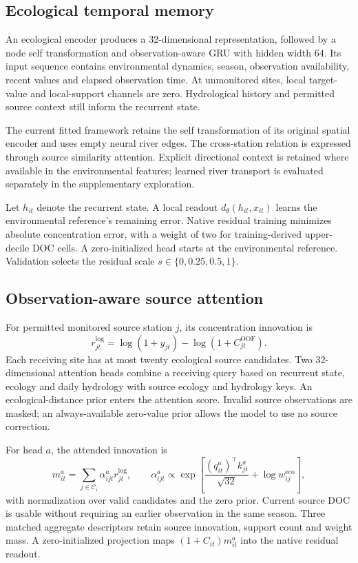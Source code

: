 \documentclass[11pt]{article}
\begin{document}
\subsection{Ecological temporal memory}
An ecological encoder produces a 32-dimensional representation, followed by a node self transformation and observation-aware GRU with hidden width 64. Its input sequence contains environmental dynamics, season, observation availability, recent values and elapsed observation time. At unmonitored sites, local target-value and local-support channels are zero. Hydrological history and permitted source context still inform the recurrent state.

The current fitted framework retains the self transformation of its original spatial encoder and uses empty neural river edges. The cross-station relation is expressed through source similarity attention. Explicit directional context is retained where available in the environmental features; learned river transport is evaluated separately in the supplementary exploration.

Let $h_{it}$ denote the recurrent state. A local readout $d_\theta(h_{it},x_{it})$ learns the environmental reference's remaining error. Native residual training minimizes absolute concentration error, with a weight of two for training-derived upper-decile DOC cells. A zero-initialized head starts at the environmental reference. Validation selects the residual scale $s\in\{0,0.25,0.5,1\}$.

\subsection{Observation-aware source attention}
For permitted monitored source station $j$, its concentration innovation is
\[
 r^{\log}_{jt}=\log(1+y_{jt})-\log(1+C^{\mathrm{OOF}}_{jt}).
\]
Each receiving site has at most twenty ecological source candidates. Two 32-dimensional attention heads combine a receiving query based on recurrent state, ecology and daily hydrology with source ecology and hydrology keys. An ecological-distance prior enters the attention score. Invalid source observations are masked; an always-available zero-value prior allows the model to use no source correction.

For head $a$, the attended innovation is
\[
 m^a_{it}=\sum_{j\in\mathcal C_i}\alpha^a_{ijt}r^{\log}_{jt},\qquad
 \alpha^a_{ijt}\propto\exp\!\left[\frac{(q^a_{it})^\top k^a_{jt}}{\sqrt{32}}+\log w^{\mathrm{eco}}_{ij}\right],
\]
with normalization over valid candidates and the zero prior. Current source DOC is usable without requiring an earlier observation in the same season. Three matched aggregate descriptors retain source innovation, support count and weight mass. A zero-initialized projection maps $(1+C_{it})m^a_{it}$ into the native residual readout.
\end{document}
